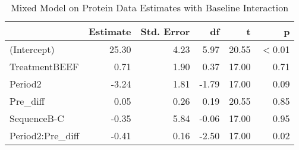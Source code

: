 \begin{table}[hbt]

\caption{\label{tab:proteinDataEstimates}Mixed Model on Protein Data Estimates with Baseline Interaction}
\centering
\begin{tabular}[t]{>{}l|rrrrr}
\toprule
 & Estimate & Std. Error & df & t & p\\
\midrule
(Intercept) & 25.30 & 4.23 & 5.97 & 20.55 & $<$0.01\\
TreatmentBEEF & 0.71 & 1.90 & 0.37 & 17.00 & 0.71\\
Period2 & -3.24 & 1.81 & -1.79 & 17.00 & 0.09\\
Pre\_diff & 0.05 & 0.26 & 0.19 & 20.55 & 0.85\\
SequenceB-C & -0.35 & 5.84 & -0.06 & 17.00 & 0.95\\
Period2:Pre\_diff & -0.41 & 0.16 & -2.50 & 17.00 & 0.02\\
\bottomrule
\end{tabular}
\end{table}
